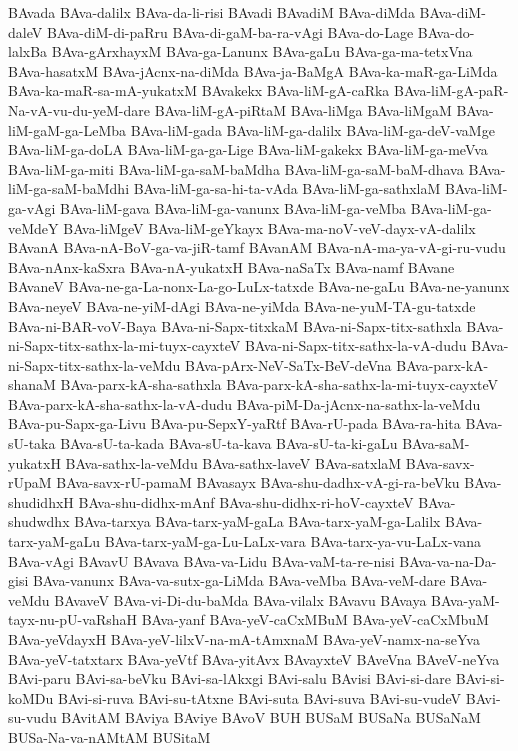 {BAvada
BAva-dalilx
BAva-da-li-risi
BAvadi
BAvadiM
BAva-diMda
BAva-diM-daleV
BAva-diM-di-paRru
BAva-di-gaM-ba-ra-vAgi
BAva-do-Lage
BAva-do-lalxBa
BAva-gArxhayxM
BAva-ga-Lanunx
BAva-gaLu
BAva-ga-ma-tetxVna
BAva-hasatxM
BAva-jAcnx-na-diMda
BAva-ja-BaMgA
BAva-ka-maR-ga-LiMda
BAva-ka-maR-sa-mA-yukatxM
BAvakekx
BAva-liM-gA-caRka
BAva-liM-gA-paR-Na-vA-vu-du-yeM-dare
BAva-liM-gA-piRtaM
BAva-liMga
BAva-liMgaM
BAva-liM-gaM-ga-LeMba
BAva-liM-gada
BAva-liM-ga-dalilx
BAva-liM-ga-deV-vaMge
BAva-liM-ga-doLA
BAva-liM-ga-ga-Lige
BAva-liM-gakekx
BAva-liM-ga-meVva
BAva-liM-ga-miti
BAva-liM-ga-saM-baMdha
BAva-liM-ga-saM-baM-dhava
BAva-liM-ga-saM-baMdhi
BAva-liM-ga-sa-hi-ta-vAda
BAva-liM-ga-sathxlaM
BAva-liM-ga-vAgi
BAva-liM-gava
BAva-liM-ga-vanunx
BAva-liM-ga-veMba
BAva-liM-ga-veMdeY
BAva-liMgeV
BAva-liM-geYkayx
BAva-ma-noV-veV-dayx-vA-dalilx
BAvanA
BAva-nA-BoV-ga-va-jiR-tamf
BAvanAM
BAva-nA-ma-ya-vA-gi-ru-vudu
BAva-nAnx-kaSxra
BAva-nA-yukatxH
BAva-naSaTx
BAva-namf
BAvane
BAvaneV
BAva-ne-ga-La-nonx-La-go-LuLx-tatxde
BAva-ne-gaLu
BAva-ne-yanunx
BAva-neyeV
BAva-ne-yiM-dAgi
BAva-ne-yiMda
BAva-ne-yuM-TA-gu-tatxde
BAva-ni-BAR-voV-Baya
BAva-ni-Sapx-titxkaM
BAva-ni-Sapx-titx-sathxla
BAva-ni-Sapx-titx-sathx-la-mi-tuyx-cayxteV
BAva-ni-Sapx-titx-sathx-la-vA-dudu
BAva-ni-Sapx-titx-sathx-la-veMdu
BAva-pArx-NeV-SaTx-BeV-deVna
BAva-parx-kA-shanaM
BAva-parx-kA-sha-sathxla
BAva-parx-kA-sha-sathx-la-mi-tuyx-cayxteV
BAva-parx-kA-sha-sathx-la-vA-dudu
BAva-piM-Da-jAcnx-na-sathx-la-veMdu
BAva-pu-Sapx-ga-Livu
BAva-pu-SepxY-yaRtf
BAva-rU-pada
BAva-ra-hita
BAva-sU-taka
BAva-sU-ta-kada
BAva-sU-ta-kava
BAva-sU-ta-ki-gaLu
BAva-saM-yukatxH
BAva-sathx-la-veMdu
BAva-sathx-laveV
BAva-satxlaM
BAva-savx-rUpaM
BAva-savx-rU-pamaM
BAvasayx
BAva-shu-dadhx-vA-gi-ra-beVku
BAva-shudidhxH
BAva-shu-didhx-mAnf
BAva-shu-didhx-ri-hoV-cayxteV
BAva-shudwdhx
BAva-tarxya
BAva-tarx-yaM-gaLa
BAva-tarx-yaM-ga-Lalilx
BAva-tarx-yaM-gaLu
BAva-tarx-yaM-ga-Lu-LaLx-vara
BAva-tarx-ya-vu-LaLx-vana
BAva-vAgi
BAvavU
BAvava
BAva-va-Lidu
BAva-vaM-ta-re-nisi
BAva-va-na-Da-gisi
BAva-vanunx
BAva-va-sutx-ga-LiMda
BAva-veMba
BAva-veM-dare
BAva-veMdu
BAvaveV
BAva-vi-Di-du-baMda
BAva-vilalx
BAvavu
BAvaya
BAva-yaM-tayx-nu-pU-vaRshaH
BAva-yanf
BAva-yeV-caCxMBuM
BAva-yeV-caCxMbuM
BAva-yeVdayxH
BAva-yeV-lilxV-na-mA-tAmxnaM
BAva-yeV-namx-na-seYva
BAva-yeV-tatxtarx
BAva-yeVtf
BAva-yitAvx
BAvayxteV
BAveVna
BAveV-neYva
BAvi-paru
BAvi-sa-beVku
BAvi-sa-lAkxgi
BAvi-salu
BAvisi
BAvi-si-dare
BAvi-si-koMDu
BAvi-si-ruva
BAvi-su-tAtxne
BAvi-suta
BAvi-suva
BAvi-su-vudeV
BAvi-su-vudu
BAvitAM
BAviya
BAviye
BAvoV
BUH
BUSaM
BUSaNa
BUSaNaM
BUSa-Na-va-nAMtAM
BUSitaM
}

